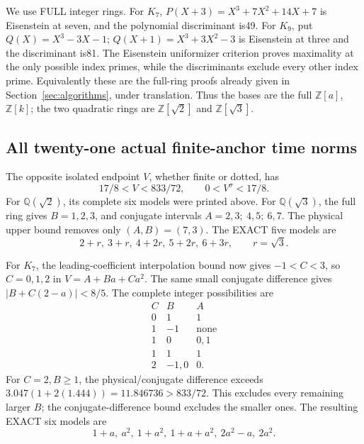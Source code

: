 \documentclass[11pt]{article}
\begin{document}
We use FULL integer rings.
For \(K_7\), \(P(X+3)=X^3+7X^2+14X+7\) is Eisenstein
at seven, and the polynomial discriminant is49.
For \(K_9\), put \(Q(X)=X^3-3X-1\);
\(Q(X+1)=X^3+3X^2-3\) is Eisenstein at three and the
discriminant is81.
The Eisenstein uniformizer criterion proves maximality at the
only possible index primes, while the discriminants exclude
every other index prime.
Equivalently these are the full-ring proofs already given in
Section~\ref{sec:algorithms}, under translation.
Thus the bases are the full \(\mathbb Z[a]\), \(\mathbb Z[k]\);
the two quadratic rings are \(\mathbb Z[\sqrt2]\) and
\(\mathbb Z[\sqrt3]\).

\subsection{All twenty-one actual finite-anchor time norms}
\label{app:arithA16times}

The opposite isolated endpoint \(V\), whether finite or dotted,
has
\[
                    17/8<V<833/72,\qquad0<V^\sigma<17/8 .
\]
For \(\mathbb Q(\sqrt2)\), its complete six models were printed
above.
For \(\mathbb Q(\sqrt3)\), the full ring gives
\(B=1,2,3\), and conjugate intervals
\(A=2,3;\ 4,5;\ 6,7\).
The physical upper bound removes only \((A,B)=(7,3)\).
The EXACT five models are
\[
                    2+r,\ 3+r,\ 4+2r,\ 5+2r,\ 6+3r,
                    \qquad r=\sqrt3.
\]

For \(K_7\), the leading-coefficient interpolation bound now
gives \(-1<C<3\), so \(C=0,1,2\) in \(V=A+Ba+Ca^2\).
The same small conjugate difference gives
\(|B+C(2-a)|<8/5\).
The complete integer possibilities are
\[
\begin{array}{c|c|c}
C&B&A\\ \hline
0&1&1\\
1&-1&\text{none}\\
1&0&0,1\\
1&1&1\\
2&-1,0&0 .
\end{array}
\]
For \(C=2,B\ge1\), the physical/conjugate difference exceeds
\(3.047(1+2(1.444))=11.846736>833/72\).
This excludes every remaining larger \(B\);
the conjugate-difference bound excludes the smaller ones.
The resulting EXACT six models are
\[
                 1+a,\ a^2,\ 1+a^2,\ 1+a+a^2,\ 2a^2-a,\ 2a^2 .
\]
\end{document}
